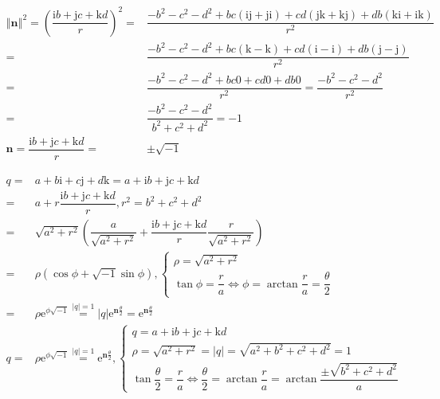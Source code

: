 \documentclass[
]{book}
\theoremstyle{definition}
\theoremstyle{definition}
\theoremstyle{definition}
\theoremstyle{definition}
\theoremstyle{remark}
\begin{document}
\[
\begin{aligned}
\left\Vert \boldsymbol{n}\right\Vert ^{2}=\left(\dfrac{\mathrm{i}b+\mathrm{j}c+\mathrm{k}d}{r}\right)^{2}= & \dfrac{-b^{2}-c^{2}-d^{2}+bc\left(\mathrm{i}\mathrm{j}+\mathrm{j}\mathrm{i}\right)+cd\left(\mathrm{j}\mathrm{k}+\mathrm{k}\mathrm{j}\right)+db\left(\mathrm{k}\mathrm{i}+\mathrm{i}\mathrm{k}\right)}{r^{2}}\\
= & \dfrac{-b^{2}-c^{2}-d^{2}+bc\left(\mathrm{k}-\mathrm{k}\right)+cd\left(\mathrm{i}-\mathrm{i}\right)+db\left(\mathrm{j}-\mathrm{j}\right)}{r^{2}}\\
= & \dfrac{-b^{2}-c^{2}-d^{2}+bc0+cd0+db0}{r^{2}}=\dfrac{-b^{2}-c^{2}-d^{2}}{r^{2}}\\
= & \dfrac{-b^{2}-c^{2}-d^{2}}{b^{2}+c^{2}+d^{2}}=-1\\
\boldsymbol{n}=\dfrac{\mathrm{i}b+\mathrm{j}c+\mathrm{k}d}{r}= & \pm\sqrt{-1}
\end{aligned}
\]

\[
\begin{aligned}
q= & a+b\mathrm{i}+c\mathrm{j}+d\mathrm{k}=a+\mathrm{i}b+\mathrm{j}c+\mathrm{k}d\\
= & a+r\dfrac{\mathrm{i}b+\mathrm{j}c+\mathrm{k}d}{r},r^{2}=b^{2}+c^{2}+d^{2}\\
= & \sqrt{a^{2}+r^{2}}\left(\dfrac{a}{\sqrt{a^{2}+r^{2}}}+\dfrac{\mathrm{i}b+\mathrm{j}c+\mathrm{k}d}{r}\dfrac{r}{\sqrt{a^{2}+r^{2}}}\right)\\
= & \rho\left(\cos\phi+\sqrt{-1}\sin\phi\right),\begin{cases}
\rho=\sqrt{a^{2}+r^{2}}\\
\tan\phi=\dfrac{r}{a}\Leftrightarrow\phi=\arctan\dfrac{r}{a}=\dfrac{\theta}{2}
\end{cases}\\
= & \rho\mathrm{e}^{\phi\sqrt{-1}}\overset{\left|q\right|=1}{=}\left|q\right|\mathrm{e}^{\boldsymbol{n}\frac{\theta}{2}}=\mathrm{e}^{\boldsymbol{n}\frac{\theta}{2}}\\
q= & \rho\mathrm{e}^{\phi\sqrt{-1}}\overset{\left|q\right|=1}{=}\mathrm{e}^{\boldsymbol{n}\frac{\theta}{2}},\begin{cases}
q=a+\mathrm{i}b+\mathrm{j}c+\mathrm{k}d\\
\rho=\sqrt{a^{2}+r^{2}}=\left|q\right|=\sqrt{a^{2}+b^{2}+c^{2}+d^{2}}=1\\
\tan\dfrac{\theta}{2}=\dfrac{r}{a}\Leftrightarrow\dfrac{\theta}{2}=\arctan\dfrac{r}{a}=\arctan\dfrac{\pm\sqrt{b^{2}+c^{2}+d^{2}}}{a}
\end{cases}
\end{aligned}
\]
\end{document}
